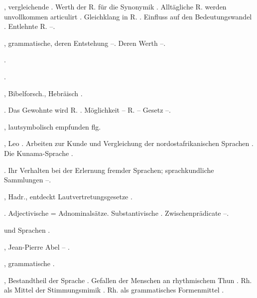 \begin{register}

, vergleichende \pageref{sp.42}. Werth der R. für die Synonymik \pageref{sp.100}. Alltägliche R. werden unvollkommen articulirt \pageref{sp.182}. Gleichklang in R. \pageref{sp.222}. Einfluss auf den Bedeutungswandel \pageref{sp.234}. Entlehnte R. \pageref{sp.270}–\pageref{sp.273}.

, grammatische, deren Entstehung \pageref{sp.381}–\pageref{sp.385}. Deren Werth \pageref{sp.438}–\pageref{sp.442}.

 \pageref{sp.102}.


 \pageref{sp.309}.

, Bibelforsch., Hebräisch \pageref{sp.25}.

. Das Gewohnte wird R. \pageref{sp.382}. Möglichkeit – R. – Gesetz \pageref{sp.385}–\pageref{sp.387}.

, lautsymbolisch empfunden \pageref{sp.220} flg.


, Leo \pageref{sp.69}. Arbeiten zur Kunde und Vergleichung der nordostafrikanischen Sprachen \pageref{sp.162}. Die Kunama-Sprache \pageref{sp.379}.

. Ihr Verhalten bei der Erlernung fremder Sprachen; sprachkundliche Sammlungen \pageref{sp.68}–\pageref{sp.69}.

, Hadr., entdeckt Lautvertretungsgesetze \pageref{sp.26}.

. Adjectivische = Adnominalsätze. Substantivische \pageref{sp.104}. Zwischenprädicate \pageref{sp.457}–\pageref{sp.459}.

 und Sprachen \pageref{sp.17}.

, Jean-Pierre Abel – \pageref{sp.81}.

, grammatische \pageref{sp.109}.


, Bestandtheil der Sprache \pageref{sp.34}.  Gefallen der Menschen an rhythmischem Thun \pageref{sp.226}. Rh. als Mittel der Stimmungsmimik \pageref{sp.380}. Rh. als grammatisches Formenmittel \pageref{sp.461}.


\end{register}
